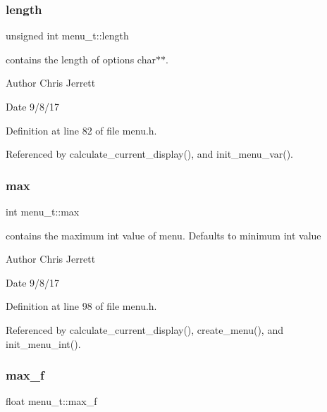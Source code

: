 \subsubsection{\texorpdfstring{length}{length}}
{\footnotesize\ttfamily unsigned int menu\+\_\+t\+::length}



contains the length of options char$\ast$$\ast$. 

\begin{DoxyAuthor}{Author}
Chris Jerrett 
\end{DoxyAuthor}
\begin{DoxyDate}{Date}
9/8/17 
\end{DoxyDate}


Definition at line 82 of file menu.\+h.



Referenced by calculate\+\_\+current\+\_\+display(), and init\+\_\+menu\+\_\+var().

\mbox{\label{structmenu__t_ace9cbaecd7bf311be0ef230da657f406}} 
\subsubsection{\texorpdfstring{max}{max}}
{\footnotesize\ttfamily int menu\+\_\+t\+::max}



contains the maximum int value of menu. Defaults to minimum int value 

\begin{DoxyAuthor}{Author}
Chris Jerrett 
\end{DoxyAuthor}
\begin{DoxyDate}{Date}
9/8/17 
\end{DoxyDate}


Definition at line 98 of file menu.\+h.



Referenced by calculate\+\_\+current\+\_\+display(), create\+\_\+menu(), and init\+\_\+menu\+\_\+int().

\mbox{\label{structmenu__t_a14b11d0a7610484462c8a6e93068a2c1}} 
\subsubsection{\texorpdfstring{max\+\_\+f}{max\_f}}
{\footnotesize\ttfamily float menu\+\_\+t\+::max\+\_\+f}



